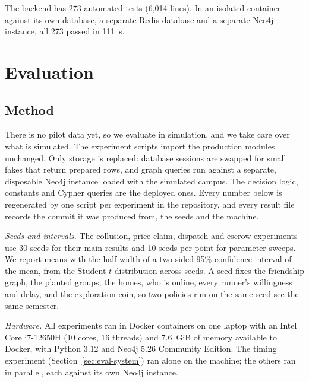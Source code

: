 \documentclass[journal]{IEEEtran}
\begin{document}
The backend has 273 automated tests (6,014 lines). In an isolated container against
its own database, a separate Redis database and a separate Neo4j instance, all 273
passed in 111~s.

\section{Evaluation}\label{sec:eval}

\subsection{Method}\label{sec:eval-method}
There is no pilot data yet, so we evaluate in simulation, and we take care over what
is simulated. The experiment scripts import the production modules unchanged. Only
storage is replaced: database sessions are swapped for small fakes that return
prepared rows, and graph queries run against a separate, disposable Neo4j instance
loaded with the simulated campus. The decision logic, constants and Cypher queries are
the deployed ones. Every number below is regenerated by one script per experiment in
the repository, and every result file records the commit it was produced from, the
seeds and the machine.

\emph{Seeds and intervals.} The collusion, price-claim, dispatch and escrow
experiments use 30 seeds for their main results and 10 seeds per point for parameter
sweeps. We report means with the half-width of a two-sided 95\% confidence interval
of the mean, from the Student $t$ distribution across seeds. A seed fixes the
friendship graph, the planted groups, the homes, who is online, every runner's
willingness and delay, and the exploration coin, so two policies run on the same
seed see the same semester.

\emph{Hardware.} All experiments ran in Docker containers on one laptop with an
Intel Core i7-12650H (10 cores, 16 threads) and 7.6~GiB of memory available to
Docker, with Python 3.12 and Neo4j 5.26 Community Edition. The timing experiment
(Section~\ref{sec:eval-system}) ran alone on the machine; the others ran in
parallel, each against its own Neo4j instance.
\end{document}
